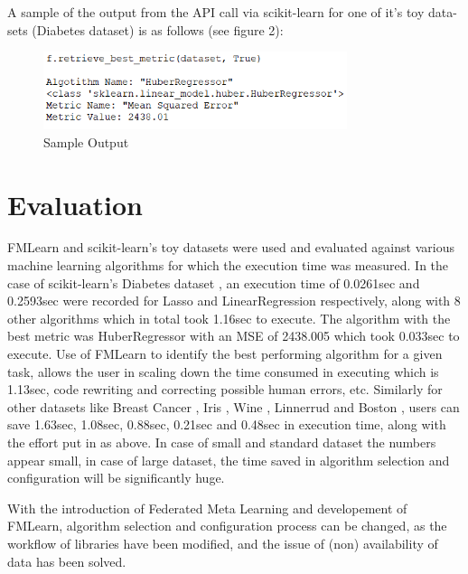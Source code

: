 \documentclass{article}
\begin{document}
A sample of the output from the API call via scikit-learn for one of it's toy data-sets (Diabetes dataset) \cite{bradley-et-al} is as follows (see figure 2):
\begin{figure}[ht]
    \centering
    \includegraphics[width=3.5in]{sample-output.PNG}
    \caption{Sample Output}
    \label{sample-output}
\end{figure}


\section{Evaluation}
FMLearn and scikit-learn's toy datasets were used and evaluated against various machine learning algorithms for which the execution time was measured. In the case of scikit-learn’s Diabetes dataset \cite{bradley-et-al}, an execution time of 0.0261sec and 0.2593sec were recorded for Lasso and LinearRegression respectively, along with 8 other algorithms which in total took 1.16sec to execute. The algorithm with the best metric was HuberRegressor with an MSE of 2438.005 which took 0.033sec to execute. Use of FMLearn to identify the best performing algorithm for a given task, allows the user in scaling down the time consumed in executing which is 1.13sec, code rewriting and correcting possible human errors, etc. Similarly for other datasets like Breast Cancer \cite{brendan-et-al}, Iris \cite{fisher:r}, Wine \cite{lichman:m}, Linnerrud \cite{tenenhaus:m} and Boston \cite{harrison-et-al}, users can save 1.63sec, 1.08sec, 0.88sec, 0.21sec and 0.48sec in execution time, along with the effort put in as above. In case of small and standard dataset the numbers appear small, in case of large dataset, the time saved in algorithm selection and configuration will be significantly huge.

With the introduction of Federated Meta Learning and developement of FMLearn, algorithm selection and configuration process can be changed, as the workflow of libraries have been modified, and the issue of (non) availability of data has been solved.
\end{document}
